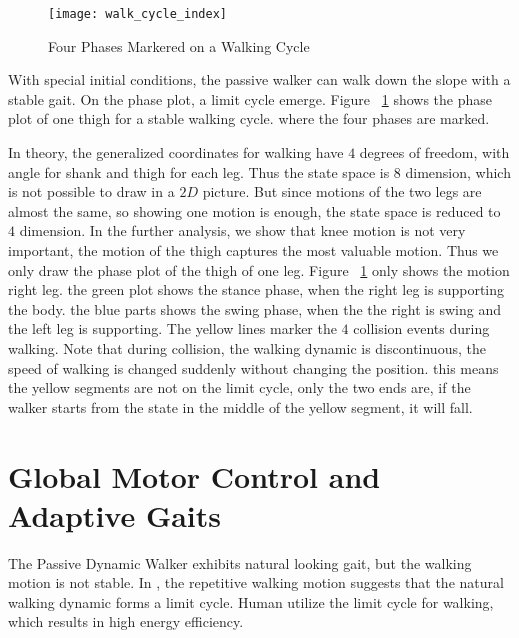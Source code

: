 \begin{figure}[!htbp]
  \begin{center}
    \texttt{[image: walk\_cycle\_index]}
    \caption{Four Phases Markered on a Walking Cycle}
    \label{fig:phasesmaker}
\end{center}
\end{figure}
With special initial conditions, the passive walker can walk down the slope with a stable gait.
On the phase plot,  a limit cycle emerge. 
Figure ~\ref{fig:phasesmaker} shows the phase plot of one thigh for a stable walking cycle.
where the four phases are marked. 

In theory, the generalized coordinates for walking have $4$ degrees of freedom, with angle for shank and thigh for each leg.
Thus the state space is $8$ dimension, which is not possible to draw in a $2D$ picture.
But since motions of the two legs are almost the same, so showing one motion is enough, the state space is reduced to $4$ dimension.
In the further analysis, we show that knee motion is not very important, the motion of the thigh captures the most valuable motion.
Thus we only draw the phase plot of the thigh of one leg.
Figure ~\ref{fig:phasesmaker} only shows the motion right leg.
the green plot shows the stance phase, when the right leg is supporting the body.
the blue parts shows the swing phase, when the the right is swing and the left leg is supporting.
The yellow lines marker the $4$ collision events during walking.
Note that during collision, the walking dynamic is discontinuous, the speed of walking is changed suddenly without changing the position.
this means the yellow segments are not on the limit cycle, only the two ends are, if the walker starts from the state in the middle of the yellow segment, it will fall.











\section{Global Motor Control and Adaptive Gaits}
The Passive Dynamic Walker exhibits natural looking gait, but the walking motion is not stable.
In \moit, the repetitive walking motion suggests that the natural walking dynamic forms a limit cycle.
Human utilize the limit cycle for walking, which results in high energy efficiency.

